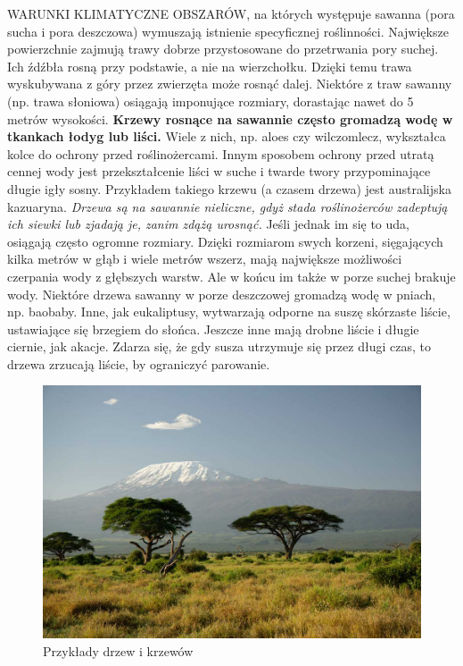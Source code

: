 \documentclass[14pt]{beamer}
\begin{document}
\begin{frame}{\color{black}{Roślinność}}
    \tiny   \uppercase{Warunki klimatyczne obszarów}, na których występuje sawanna (pora sucha i pora deszczowa) wymuszają istnienie specyficznej roślinności. Największe powierzchnie zajmują trawy dobrze przystosowane do przetrwania pory suchej. Ich źdźbła rosną przy podstawie, a nie na wierzchołku. Dzięki temu trawa wyskubywana z góry przez zwierzęta może rosnąć dalej. Niektóre z traw sawanny (np. trawa słoniowa) osiągają imponujące rozmiary, dorastając nawet do 5 metrów wysokości.
    \tiny   \textbf{Krzewy rosnące na sawannie często gromadzą wodę w tkankach łodyg lub liści.}  Wiele z nich, np. aloes czy wilczomlecz, wykształca kolce do ochrony przed roślinożercami. Innym sposobem ochrony przed utratą cennej wody jest przekształcenie liści w suche i twarde twory przypominające długie igły sosny. Przykładem takiego krzewu (a czasem drzewa) jest australijska kazuaryna.
    \tiny   \emph{Drzewa są na sawannie nieliczne, gdyż stada roślinożerców zadeptują ich siewki lub zjadają je, zanim zdążą urosnąć.} Jeśli jednak im się to uda, osiągają często ogromne rozmiary. Dzięki rozmiarom swych korzeni, sięgających kilka metrów w głąb i wiele metrów wszerz, mają największe możliwości czerpania wody z głębszych warstw. Ale w końcu im także w porze suchej brakuje wody. Niektóre drzewa sawanny w porze deszczowej gromadzą wodę w pniach, np. baobaby. Inne, jak eukaliptusy, wytwarzają odporne na suszę skórzaste liście, ustawiające się brzegiem do słońca. Jeszcze inne mają drobne liście i długie ciernie, jak akacje. Zdarza się, że gdy susza utrzymuje się przez długi czas, to drzewa zrzucają liście, by ograniczyć parowanie.
\end{frame}

\begin{frame}{\color{black}{Zdjęcia roślinności}}
    \begin{figure}
        \centering
        \includegraphics[scale = 0.25]{Sawanna1.jpg}
        \caption{Przykłady drzew i krzewów}
        \label{fig:my_label}
    \end{figure}
\end{frame}
\end{document}
